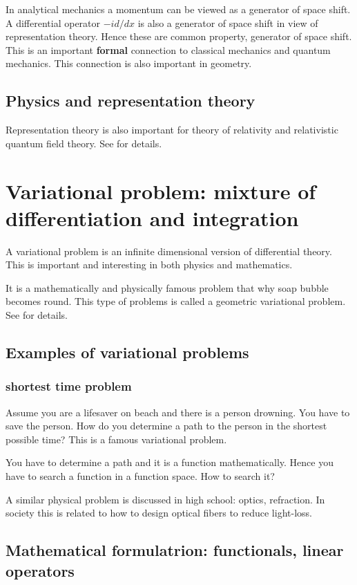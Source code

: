 \documentclass[openany, a4paper, oneside]{jsbook}
\theoremstyle{break}
\theoremstyle{breakdefn}
\begin{document}
In analytical mechanics a momentum
can be viewed as a generator of space shift.
A differential operator $- i d/dx$ is also
a generator of space shift in view of representation theory.
Hence these are common property, generator of space shift.
This is an important \textbf{formal} connection to classical mechanics and quantum mechanics.
This connection is also important in geometry.
\subsection{Physics and representation theory}


Representation theory is also important for
theory of relativity and relativistic quantum field theory.
See \cite{TakeshiHirai1, TakeshiHirai2} for details.
\section{Variational problem: mixture of differentiation and integration}


A variational problem is an infinite dimensional version of differential theory.
This is important and interesting in both physics and mathematics.

It is a mathematically and physically famous problem that why soap bubble becomes round.
This type of problems is called a geometric variational problem.
See \cite{SeikiNishikawa1} for details.
\subsection{Examples of variational problems}

\subsubsection{shortest time problem}


Assume you are a lifesaver on beach and there is a person drowning.
You have to save the person.
How do you determine a path to the person in the shortest possible time?
This is a famous variational problem.

You have to determine a path and it is a function mathematically.
Hence you have to search a function in a function space.
How to search it?

A similar physical problem is discussed in high school: optics, refraction.
In society this is related to how to design optical fibers to reduce light-loss.
\subsection{Mathematical formulatrion: functionals, linear operators}
\end{document}
